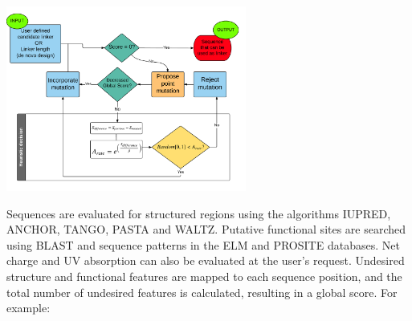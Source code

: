 \documentclass[portrait,final,paperwidth=90cm,paperheight=130cm,fontscale=0.295]{baposter}
\begin{document}
\begin{poster}
{
\begin{minipage}{\linewidth}
\begin{minipage}{0.47\linewidth}
\includegraphics[width=0.99\linewidth, height=230px]{figures/patenaFull.png}
\end{minipage}
\begin{minipage}{0.49\linewidth}
Sequences are evaluated for structured regions using the algorithms IUPRED\cite{dosztanyi2005pairwise}, ANCHOR\cite{meszaros2009prediction}, TANGO\cite{fernandez2004prediction}, PASTA\cite{trovato2006insight}
and WALTZ\cite{maurer2010exploring}. Putative functional sites are searched using BLAST\cite{altschul1990basic} and sequence patterns in the ELM\cite{puntervoll2003elm} and
PROSITE\cite{sigrist2002prosite} databases. Net charge and UV absorption can also be evaluated at the user's request. Undesired
structure and functional features are mapped to each sequence position, and the total number of undesired
features is calculated, resulting in a global score. For example: 


\end{minipage}
\end{minipage}}
\end{poster}
\end{document}
